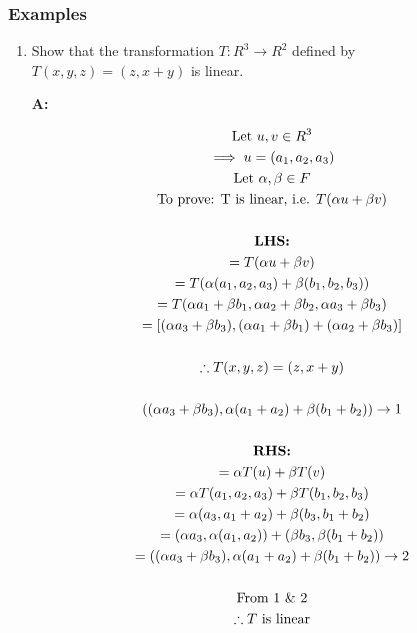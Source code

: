 \documentclass[english,course,fleqn]{lecture}
\newenvironment{qanda}{\begin{enumerate}\setlength{\parindent}{0pt}}{\medskip\end{enumerate}}
\newcommand{\Q}{\bigskip\bfseries \item}
\newcommand{\A}{\par\textbf{A:} \normalfont}
\begin{document}
\subsubsection{Examples}

\begin{qanda}

	\Q Show that the transformation $T:R^{3} \rightarrow R^{2}$ defined by $T(x,y,z) = (z,x+y)$ is linear.

	\A

	\begin{gather*}
		\text{Let }u,v \in R^{3}\\
		\implies u = (a_{1}, a_{2}, a_{3})\\
		\text{Let }\alpha,\beta \in F\\
		\text{To prove: T is linear, i.e. }T(\alpha u + \beta v)\\\\
		\text{\textbf{LHS:}}\\
		= T(\alpha u + \beta v)\\
		= T(\alpha(a_{1}, a_{2}, a_{3}) + \beta(b_{1}, b_{2}, b_{3}))\\
		= T(\alpha a_{1} + \beta b_{1}, \alpha a_{2} + \beta b_{2}, \alpha a_{3} + \beta b_{3})\\
		= [(\alpha a_{3} + \beta b_{3}), (\alpha a_{1} + \beta b_{1}) + (\alpha a_{2} + \beta b_{3})]\\
		\\
		\therefore T(x,y,z) = (z, x + y)\\
		\\
		((\alpha a_{3} + \beta b_{3}), \alpha (a_{1} + a_{2}) + \beta(b_{1} + b_{2})) \rightarrow 1\\
		\\
		\text{\textbf{RHS:}}\\
		= \alpha T(u) + \beta T (v)\\
		= \alpha T(a_{1}, a_{2}, a_{3}) + \beta T(b_{1}, b_{2}, b_{3})\\
		= \alpha(a_{3}, a_{1} + a_{2}) + \beta (b_{3}, b_{1} + b_{2})\\
		= (\alpha a_{3}, \alpha (a_{1}, a_{2})) + (\beta b_{3}, \beta (b_{1} + b_{2}))\\
		= ((\alpha a_{3} + \beta b_{3}), \alpha (a_{1} + a_{2}) + \beta (b_{1} + b_{2})) \rightarrow 2\\
		\\
		\text{From 1 \& 2}\\
		\therefore T \text{ is linear}
	\end{gather*}


\end{qanda}
\end{document}
